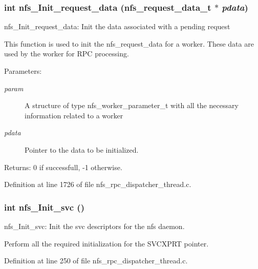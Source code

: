 \subsubsection[{nfs\_\-Init\_\-request\_\-data}]{\setlength{\rightskip}{0pt plus 5cm}int nfs\_\-Init\_\-request\_\-data (nfs\_\-request\_\-data\_\-t $\ast$ {\em pdata})}\label{nfs__rpc__dispatcher__thread_8c_fb82d52b463ced09d03ad467d1c05dd4}


nfs\_\-Init\_\-request\_\-data: Init the data associated with a pending request

This function is used to init the nfs\_\-request\_\-data for a worker. These data are used by the worker for RPC processing.

\begin{Desc}
\item[Parameters:]
\begin{description}
\item[{\em param}]A structure of type nfs\_\-worker\_\-parameter\_\-t with all the necessary information related to a worker \item[{\em pdata}]Pointer to the data to be initialized.\end{description}
\end{Desc}
\begin{Desc}
\item[Returns:]0 if successfull, -1 otherwise. \end{Desc}


Definition at line 1726 of file nfs\_\-rpc\_\-dispatcher\_\-thread.c.
\subsubsection[{nfs\_\-Init\_\-svc}]{\setlength{\rightskip}{0pt plus 5cm}int nfs\_\-Init\_\-svc ()}\label{nfs__rpc__dispatcher__thread_8c_757bd493272d902a0cdb6c565b9c6135}


nfs\_\-Init\_\-svc: Init the svc descriptors for the nfs daemon.

Perform all the required initialization for the SVCXPRT pointer. 

Definition at line 250 of file nfs\_\-rpc\_\-dispatcher\_\-thread.c.
